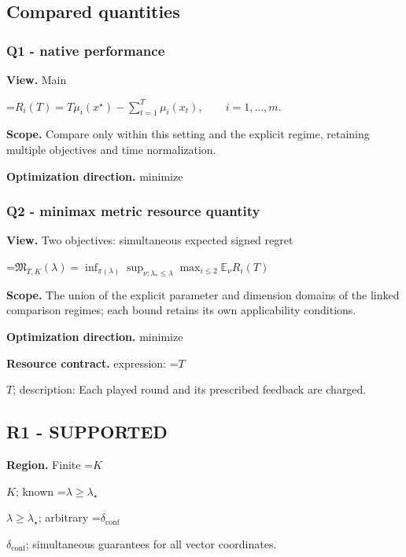 \documentclass[10pt,a4paper]{article}
\newcommand{\AtlasMath}[1]{\par\begingroup\centering\setbox0=\hbox{$\displaystyle #1$}\ifdim\wd0>1.4\linewidth\typeout{ATLAS WIDE FORMULA: \the\wd0}\fi\ifdim\wd0>\linewidth\resizebox{\linewidth}{!}{\box0}\else\box0\fi\par\endgroup}
\newcommand{\AtlasInlineMath}[1]{\begingroup\setbox0=\hbox{$#1$}\ifdim\wd0>.4\linewidth\endgroup\AtlasMath{#1}\else\endgroup$#1$\fi}
\begin{document}
\subsection{Compared quantities}


\subsubsection{Q1 - native performance}


\textbf{View.} Main



\AtlasMath{R_i(T)=T\mu_i(x^\star)-\sum_{t=1}^{T}\mu_i(x_t),\qquad i=1,\ldots,m.}


\textbf{Scope.} Compare only within this setting and the explicit regime, retaining multiple objectives and time normalization.



\textbf{Optimization direction.} minimize



\subsubsection{Q2 - minimax metric resource quantity}


\textbf{View.} Two objectives: simultaneous expected signed regret



\AtlasMath{\mathfrak M_{T,K}(\lambda)=\inf_{\pi(\lambda)}\sup_{\nu:\lambda_*\le\lambda}\max_{i\le2}\mathbb E_\nu R_i(T)}


\textbf{Scope.} The union of the explicit parameter and dimension domains of the linked comparison regimes; each bound retains its own applicability conditions.



\textbf{Optimization direction.} minimize



\textbf{Resource contract.} expression: \AtlasInlineMath{T}; description: Each played round and its prescribed feedback are charged.



\subsection{R1 - SUPPORTED}


\textbf{Region.} Finite \AtlasInlineMath{K}; known \AtlasInlineMath{\lambda\ge\lambda_\star}; arbitrary \AtlasInlineMath{\delta_{\mathrm{conf}}}; simultaneous guarantees for all vector coordinates.
\end{document}
